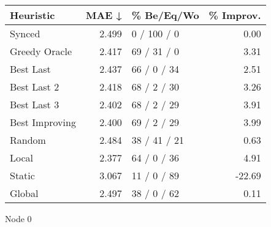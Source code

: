 \begin{tabular}{lrlr}
\toprule
\textbf{Heuristic} & \textbf{MAE ↓} & \textbf{\% Be/Eq/Wo} & \textbf{\% Improv.} \\
\midrule
            Synced &          2.499 &          0 / 100 / 0 &                0.00 \\
     Greedy Oracle &          2.417 &          69 / 31 / 0 &                3.31 \\
         Best Last &          2.437 &          66 / 0 / 34 &                2.51 \\
       Best Last 2 &          2.418 &          68 / 2 / 30 &                3.26 \\
       Best Last 3 &          2.402 &          68 / 2 / 29 &                3.91 \\
    Best Improving &          2.400 &          69 / 2 / 29 &                3.99 \\
            Random &          2.484 &         38 / 41 / 21 &                0.63 \\
             Local &          2.377 &          64 / 0 / 36 &                4.91 \\
            Static &          3.067 &          11 / 0 / 89 &              -22.69 \\
            Global &          2.497 &          38 / 0 / 62 &                0.11 \\
\bottomrule
\end{tabular}
\caption{Node 0}
\label{tab:ds_non_lr01_le2_bs2_0}
